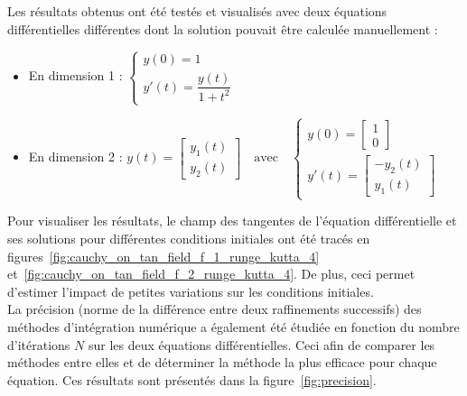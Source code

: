 \documentclass{article}
\begin{document}
Les résultats obtenus ont été testés et visualisés avec deux équations différentielles différentes dont la solution pouvait être calculée manuellement :
\begin{itemize}
  \item En dimension 1 : \( \begin{cases} y(0) = 1 \\ y'(t) = \dfrac{y(t)}{1 + t^2} \end{cases} \)
  \item En dimension 2 : \( y(t) = \begin{bmatrix} y_1(t) \\ y_2(t) \end{bmatrix} \quad \text{avec} \quad \begin{cases} y(0) = \begin{bmatrix} 1 \\ 0 \end{bmatrix} \\ y'(t) = \begin{bmatrix} -y_2(t) \\ y_1(t) \end{bmatrix} \end{cases} \)
\end{itemize}
Pour visualiser les résultats, le champ des tangentes de l'équation différentielle et ses solutions pour différentes conditions initiales ont été tracés en figures~\ref{fig:cauchy_on_tan_field_f_1_runge_kutta_4} et~\ref{fig:cauchy_on_tan_field_f_2_runge_kutta_4}. De plus, ceci permet d'estimer l'impact de petites variations sur les conditions initiales.\\
La précision (norme de la différence entre deux raffinements successifs) des méthodes d'intégration numérique a également été étudiée en fonction du nombre d'itérations \(N\) sur les deux équations différentielles. Ceci afin de comparer les méthodes entre elles et de déterminer la méthode la plus efficace pour chaque équation. Ces résultats sont présentés dans la figure~\ref{fig:precision}.
\end{document}

